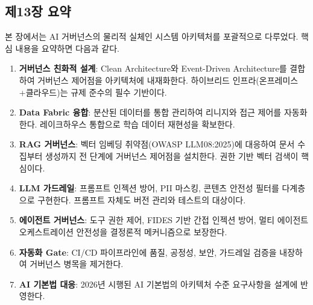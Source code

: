 \subsection*{제13장 요약}

본 장에서는 AI 거버넌스의 물리적 실체인 시스템 아키텍처를 포괄적으로 다루었다. 핵심 내용을 요약하면 다음과 같다.

\begin{enumerate}
 \item \textbf{거버넌스 친화적 설계}: Clean Architecture와 Event-Driven Architecture를 결합하여 거버넌스 제어점을 아키텍처에 내재화한다. 하이브리드 인프라(온프레미스+클라우드)는 규제 준수의 필수 기반이다.
 \item \textbf{Data Fabric 융합}: 분산된 데이터를 통합 관리하여 리니지와 접근 제어를 자동화한다. 레이크하우스 통합으로 학습 데이터 재현성을 확보한다.
 \item \textbf{RAG 거버넌스}: 벡터 임베딩 취약점(OWASP LLM08:2025)에 대응하여 문서 수집부터 생성까지 전 단계에 거버넌스 제어점을 설치한다. 권한 기반 벡터 검색이 핵심이다.
 \item \textbf{LLM 가드레일}: 프롬프트 인젝션 방어, PII 마스킹, 콘텐츠 안전성 필터를 다계층으로 구현한다. 프롬프트 자체도 버전 관리와 테스트의 대상이다.
 \item \textbf{에이전트 거버넌스}: 도구 권한 제어, FIDES 기반 간접 인젝션 방어, 멀티 에이전트 오케스트레이션 안전성을 결정론적 메커니즘으로 보장한다.
 \item \textbf{자동화 Gate}: CI/CD 파이프라인에 품질, 공정성, 보안, 가드레일 검증을 내장하여 거버넌스 병목을 제거한다.
 \item \textbf{AI 기본법 대응}: 2026년 시행된 AI 기본법의 아키텍처 수준 요구사항을 설계에 반영한다.
\end{enumerate}


